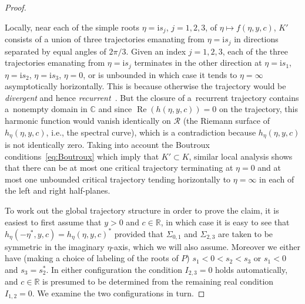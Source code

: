 \begin{proof}
\begin{itemize}
\end{itemize}
Locally, near each of the simple roots $\eta=\mathrm{i} s_j$, $j=1,2,3$, of $\eta\mapsto f(\eta,y,c)$, $K'$ consists of a union of three trajectories emanating from $\eta=\mathrm{i} s_j$ in directions separated by equal angles of $2\pi/3$. Given an index $j=1,2,3$, each of the three trajectories emanating from $\eta=\mathrm{i} s_j$ terminates in the other direction at $\eta=\mathrm{i} s_1$, $\eta=\mathrm{i} s_2$, $\eta=\mathrm{i} s_3$, $\eta=0$, or is unbounded in which case it tends to $\eta=\infty$ asymptotically horizontally. This is because otherwise the trajectory would be \emph{divergent} and hence \emph{recurrent}~\cite[Theorem 11.1]{Strebel84}. But the closure of a~recurrent trajectory contains a~nonempty domain in $\mathbb{C}$ and since $\operatorname{Re}(h(\eta,y,c))=0$ on the trajectory, this harmonic function would vanish identically on $\mathcal{R}$ (the Riemann surface of $h_\eta(\eta,y,c)$, i.e., the spectral curve), which is a contradiction because $h_\eta(\eta,y,c)$ is not identically zero. Taking into account the Boutroux conditions~\eqref{eq:Boutroux} which imply that $K'\subset K$, similar local analysis shows that there can be at most one critical trajectory terminating at $\eta=0$ and at most one unbounded critical trajectory tending horizontally to $\eta=\infty$ in each of the left and right half-planes.

To work out the global trajectory structure in order to prove the claim, it is easiest to first assume that $y>0$ and $c\in\mathbb{R}$, in which case it is easy to see that $h_\eta(-\eta^*,y,c)=h_\eta(\eta,y,c)^*$ provided that $\Sigma_{0,1}$ and $\Sigma_{2,3}$ are taken to be symmetric in the imaginary $\eta$-axis, which we will also assume. Moreover we either have (making a choice of labeling of the roots of $P$) $s_1<0<s_2<s_3$ or $s_1<0$ and $s_3=s_2^*$. In either configuration the condition $I_{2,3}=0$ holds automatically, and $c\in\mathbb{R}$ is presumed to be determined from the remaining real condition $I_{1,2}=0$. We examine the two configurations in turn.


\end{proof}
